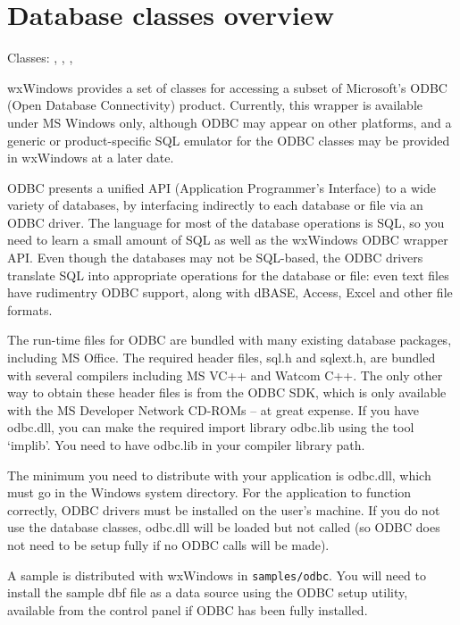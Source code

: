 \section{Database classes overview}\label{odbcoverview}

Classes: , , ,
\rtfsp{}


wxWindows provides a set of classes for accessing a subset of Microsoft's ODBC (Open Database Connectivity)
product. Currently, this wrapper is available under MS Windows only, although
ODBC may appear on other platforms, and a generic or product-specific SQL emulator for the ODBC
classes may be provided in wxWindows at a later date.

ODBC presents a unified API (Application Programmer's Interface) to a
wide variety of databases, by interfacing indirectly to each database or
file via an ODBC driver. The language for most of the database
operations is SQL, so you need to learn a small amount of SQL as well as
the wxWindows ODBC wrapper API. Even though the databases may not be
SQL-based, the ODBC drivers translate SQL into appropriate operations
for the database or file: even text files have rudimentry ODBC support,
along with dBASE, Access, Excel and other file formats.

The run-time files for ODBC are bundled with many existing database
packages, including MS Office. The required header files, sql.h and
sqlext.h, are bundled with several compilers including MS VC++ and
Watcom C++. The only other way to obtain these header files is from the
ODBC SDK, which is only available with the MS Developer Network CD-ROMs
-- at great expense. If you have odbc.dll, you can make the required
import library odbc.lib using the tool `implib'. You need to have odbc.lib
in your compiler library path.

The minimum you need to distribute with your application is odbc.dll, which must
go in the Windows system directory. For the application to function correctly,
ODBC drivers must be installed on the user's machine. If you do not use the database
classes, odbc.dll will be loaded but not called (so ODBC does not need to be
setup fully if no ODBC calls will be made).

A sample is distributed with wxWindows in {\tt samples/odbc}. You will need to install
the sample dbf file as a data source using the ODBC setup utility, available from
the control panel if ODBC has been fully installed.


